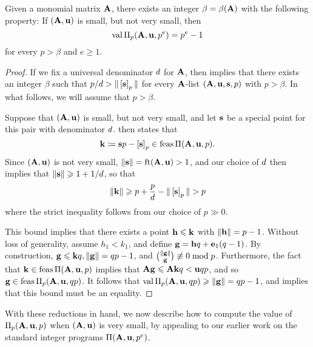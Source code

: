 \documentclass{amsart}
\begin{document}
\begin{theorem}
   \label{small not very small value: T}
   Given a monomial matrix $\mathbf{A}$, there exists an integer $\beta=\beta(\mathbf{A})$ with the following property\textup:
   If $(\mathbf{A}, \mathbf{u})$ is small, but not very small, then
   \[ \operatorname{val} \Pi_p(\mathbf{A}, \mathbf{u}, p^e) = p^e-1\]
   for every $p > \beta$ and $e \geq 1$.
\end{theorem}

\begin{proof}
   If we fix a universal denominator $d$ for $\mathbf{A}$, then  implies that there exists an integer $\beta$ such that $p/d > \| \left[ \mathbf{s} \right]_p \|$ for every $\mathbf{A}$-list $(\mathbf{A},\mathbf{u},\mathbf{s}, p)$ with $p > \beta$.
   In what follows, we will assume that $p > \beta$.

   Suppose that $(\mathbf{A},\mathbf{u})$ is small, but not very small, and let $\mathbf{s}$ be a special point for this pair with denominator $d$.
    then states that
   \[ \mathbf{k} \coloneqq \mathbf{s}p-\left[ \mathbf{s} \right]_p \in \operatorname{feas} \Pi(\mathbf{A},\mathbf{u},p). \]
   Since $(\mathbf{A},\mathbf{u})$ is not very small, $\| \mathbf{s} \| = \operatorname{ft}(\mathbf{A}, \mathbf{u}) > 1$, and our choice of $d$ then implies that $\| \mathbf{s} \| \geqslant 1 + 1/d$, so that
   \[\| \mathbf{k} \| \geqslant p + \frac{p}{d} - \| \left[ \mathbf{s} \right]_p \| > p\]
   where the strict inequality follows from our choice of $p \gg 0$.

   This bound implies that there exists a point $\mathbf{h} \leqslant \mathbf{k}$ with $\| \mathbf{h} \| = p-1$.
   Without loss of generality, assume $h_1 < k_1$, and define $\mathbf{g} = \mathbf{h}q + \mathbf{e}_1(q-1)$.
   By construction, $\mathbf{g} \leqslant \mathbf{k}q, \| \mathbf{g} \| = qp-1$, and $\binom{\| \mathbf{g} \|}{\mathbf{g}} \not\equiv 0 \bmod p$.
   Furthermore, the fact that $\mathbf{k} \in \operatorname{feas} \Pi(\mathbf{A},\mathbf{u},p)$ implies that $\mathbf{A}\mathbf{g} \leqslant \mathbf{A}{\mathbf{k}}q < \mathbf{u}qp$, and so $\mathbf{g} \in \operatorname{feas} \Pi_p(\mathbf{A},\mathbf{u},qp)$.
   It follows that $\operatorname{val} \Pi_p(\mathbf{A},\mathbf{u},qp) \geqslant \| \mathbf{g} \| = qp-1$, and  implies that this bound must be an equality.
\end{proof}

With these reductions in hand, we now describe how to compute the value of $\Pi_p(\mathbf{A}, \mathbf{u}, p)$ when $(\mathbf{A}, \mathbf{u})$ is very small,  by appealing to our earlier work on the standard integer programs $\Pi(\mathbf{A}, \mathbf{u}, p^e)$.
\end{document}
